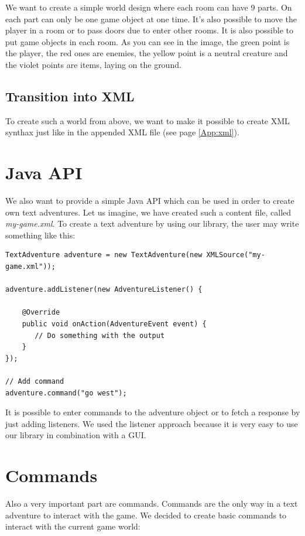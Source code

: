 \documentclass[dvips,12pt]{article}
\begin{document}
We want to create a simple world design where each room can have 9 parts. On each part can only be one game object at one time. It's also possible to move the player in a room or to pass doors due to enter other rooms. It is also possible to put game objects in each room. As you can see in the image, the green point is the player, the red ones are enemies, the yellow point is a neutral creature and the violet points are items, laying on the ground.

\subsection{Transition into XML}

To create such a world from above, we want to make it possible to create XML synthax just like in the appended XML file (see page \ref{App:xml}).

\section{Java API}

We also want to provide a simple Java API which can be used in order to create own text adventures. Let us imagine, we have created such a content file, called \emph{my-game.xml}. To create a text adventure by using our library, the user may write something like this:

\begin{verbatim}
TextAdventure adventure = new TextAdventure(new XMLSource("my-game.xml"));

adventure.addListener(new AdventureListener() {

    @Override
    public void onAction(AdventureEvent event) {
       // Do something with the output
    }
});

// Add command
adventure.command("go west");
\end{verbatim}

It is possible to enter commands to the adventure object or to fetch a response by just adding listeners. We used the listener approach because it is very easy to use our library in combination with a GUI.


\section{Commands}

Also a very important part are commands. Commands are the only way in a text adventure to interact with the game. We decided to create basic commands to interact with the current game world:
\end{document}
